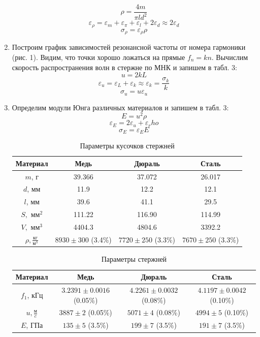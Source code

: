 \documentclass[a4paper, 10pt]{article}%
\begin{document}
\begin{enumerate}
		\[\rho = \dfrac{4m}{\pi l d^2}\]
		\[\varepsilon_\rho = \varepsilon_m + \varepsilon_\pi + \varepsilon_l + 2\varepsilon_d \approx 2\varepsilon_d\]
		\[\sigma_\rho = \varepsilon_\rho\rho\]
		\item Построим график зависимостей резонансной частоты от номера гармоники (рис. 1). Видим, что точки хорошо ложаться на прямые $f_n = kn$. Вычислим скорость распространения волн в стержне по МНК и запишем в табл. 3:
		\[u = 2kL\]
		\[\varepsilon_u = \varepsilon_L + \varepsilon_k \approx \varepsilon_k = \dfrac{\sigma_k}{k}\]
		\[\sigma_u = u\varepsilon_u\]
		\item Определим модули Юнга различных материалов и запишем в табл. 3:
		\[E = u^2\rho\]
		\[\varepsilon_E = 2\varepsilon_u + \varepsilon_rho\]
		\[\sigma_E = \varepsilon_EE\]
		\begin{table}
			\centering
			\caption{Параметры кусочков стержней}
			\begin{tabular}{|c|c|c|c|}
				\hline
				Материал & Медь & Дюраль & Сталь \\
				\hline
				$m$, г & 39.366 & 37.072 & 26.017 \\
				\hline
				$d$, мм & 11.9 & 12.2 & 12.1 \\
				\hline
				$l$, мм & 39.6 & 41.1 & 29.5 \\
				\hline
				$S, \text{ мм}^2$ & 111.22 & 116.90 & 114.99 \\
				\hline
				$V, \text{ мм}^3$ & 4404.3 & 4804.6 & 3392.2 \\
				\hline
				$\rho, \frac{\text{кг}}{\text{м}^3}$ & $8930 \pm 300$ (3.4\%)  & $7720 \pm 250$ (3.3\%) & $7670 \pm 250$ (3.3\%) \\
				\hline
			\end{tabular}
		\end{table}
		\begin{table}
			\centering
			\caption{Параметры стержней}
			\begin{tabular}{|c|c|c|c|}
				\hline
				Материал & Медь & Дюраль & Сталь \\
				\hline
				$f_1$, кГц & $3.2391 \pm 0.0016$ (0.05\%) & $4.2261 \pm 0.0032$ (0.08\%) & $4.1197 \pm 0.0042$ (0.10\%) \\
				\hline
				$u, \frac{\text{м}}{c}$ & $3887 \pm 2$ (0.05\%) & $5071 \pm 4$ (0.08\%) & $4994 \pm 5$ (0.10\%) \\
				\hline
				$E$, ГПа & $135 \pm 5$ (3.5\%) & $199 \pm  7$ (3.5\%) & $191 \pm 7$ (3.5\%) \\
				\hline
			\end{tabular}

\end{table}
\end{enumerate}
\end{document}

